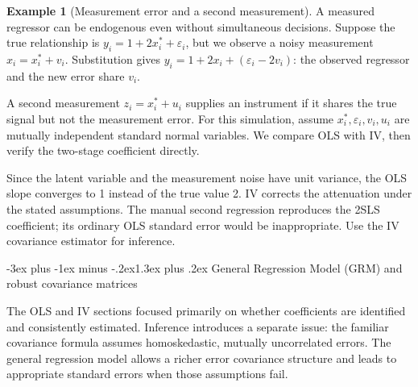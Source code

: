 \documentclass[
  11pt,
]{book}
\makeatletter
\renewcommand\section{\@startsection{section}{1}{\z@}
  {-3ex plus -1ex minus -.2ex}{1.3ex plus .2ex}
  {\normalfont\Large\bfseries\color{TextbookInk}}}
\theoremstyle{definition}
\theoremstyle{definition}
\newtheorem{example}{Example}[chapter]
\theoremstyle{definition}
\theoremstyle{definition}
\theoremstyle{remark}
\makeatother
\begin{document}
\begin{example}[Measurement error and a second measurement]
\protect\hypertarget{exm:IVmeasurement}{}\label{exm:IVmeasurement}A measured regressor can be endogenous even without simultaneous decisions. Suppose the true relationship is \(y_i=1+2x_i^*+\varepsilon_i\), but we observe a noisy measurement \(x_i=x_i^*+v_i\). Substitution gives \(y_i=1+2x_i+(\varepsilon_i-2v_i)\): the observed regressor and the new error share \(v_i\).

A second measurement \(z_i=x_i^*+u_i\) supplies an instrument if it shares the true signal but not the measurement error. For this simulation, assume \(x_i^*,\varepsilon_i,v_i,u_i\) are mutually independent standard normal variables. We compare OLS with IV, then verify the two-stage coefficient directly.

\begin{table}[H]
\centering\begingroup\fontsize{10}{12}\selectfont

\endgroup{}
\end{table}

Since the latent variable and the measurement noise have unit variance, the OLS slope converges to 1 instead of the true value 2. IV corrects the attenuation under the stated assumptions. The manual second regression reproduces the 2SLS coefficient; its ordinary OLS standard error would be inappropriate. Use the IV covariance estimator for inference.
\end{example}

\section{General Regression Model (GRM) and robust covariance matrices}\label{regression-grm}

The OLS and IV sections focused primarily on whether coefficients are identified and consistently estimated. Inference introduces a separate issue: the familiar covariance formula assumes homoskedastic, mutually uncorrelated errors. The general regression model allows a richer error covariance structure and leads to appropriate standard errors when those assumptions fail.
\end{document}

